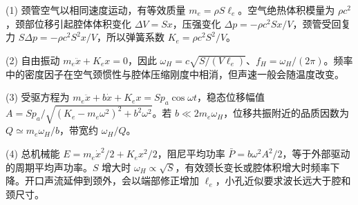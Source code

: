 (1) 颈管空气以相同速度运动，有等效质量 \(m_e=\rho S\ell_e\)。空气绝热体积模量为 \(\rho c^2\)，颈部位移引起腔体体积变化 \(\Delta V=Sx\)，压强变化 \(\Delta p=-\rho c^2Sx/V\)，颈管受回复力 \(S\Delta p=-\rho c^2S^2x/V\)，所以弹簧系数 \(K_e=\rho c^2S^2/V\)。

(2) 自由振动 \(m_e\ddot x+K_ex=0\)，因此 \(\boxed{\omega_H=c\sqrt{S/(V\ell_e)}}\)、\(f_H=\omega_H/(2\pi)\)。频率中的密度因子在空气颈惯性与腔体压缩刚度中相消，但声速一般会随温度改变。

(3) 受驱方程为 \(m_e\ddot x+b\dot x+K_ex=Sp_a\cos\omega t\)，稳态位移幅值 \(A=Sp_a/\sqrt{(K_e-m_e\omega^2)^2+b^2\omega^2}\)。若 \(b\ll2m_e\omega_H\)，位移共振附近的品质因数为 \(\boxed{Q\simeq m_e\omega_H/b}\)，带宽约 \(\omega_H/Q\)。

(4) 总机械能 \(E=m_e\dot x^2/2+K_ex^2/2\)，阻尼平均功率 \(\bar P=b\omega^2A^2/2\)，等于外部驱动的周期平均声功率。\(S\) 增大时 \(\omega_H\propto\sqrt S\)，有效颈长变长或腔体积增大时频率下降。开口声流延伸到颈外，会以端部修正增加 \(\ell_e\)，小孔近似要求波长远大于腔和颈尺寸。
